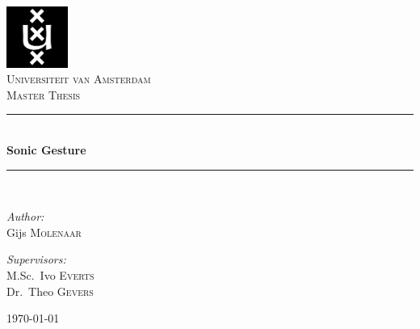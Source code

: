 \documentclass[a4paper,11pt]{report}
\newcommand{\HRule}{\rule{\linewidth}{0.5mm}}
\begin{document}
\begin{titlepage}
\begin{center}

\includegraphics[width=0.15\textwidth]{./figures/uva.png}\\[1cm]
\textsc{\LARGE Universiteit van Amsterdam}\\[1.5cm]
\textsc{\Large Master Thesis}\\[0.5cm]

\HRule \\[0.4cm]
{ \huge \bfseries Sonic Gesture}\\[0.4cm]

\HRule \\[1.5cm]

\begin{minipage}{0.4\textwidth}
\begin{flushleft} \large
\emph{Author:}\\
Gijs \textsc{Molenaar}
\end{flushleft}
\end{minipage}
\begin{minipage}{0.4\textwidth}
\begin{flushright} \large
\emph{Supervisors:} \\
M.Sc.~Ivo \textsc{Everts} \\
Dr.~Theo \textsc{Gevers}
\end{flushright}
\end{minipage}

\vfill

{\large \today}

\end{center}
\end{titlepage}
\end{document}

